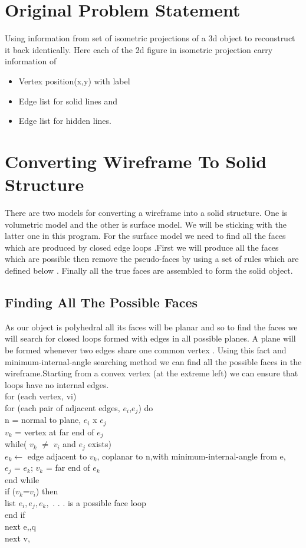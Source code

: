 \documentclass{article}
\begin{document}
\section{Original Problem Statement}
Using information from set of isometric projections of a 3d object to reconstruct it back identically. Here each of the 2d figure in isometric projection carry information of 
\begin{itemize}
\item Vertex position(x,y) with label
\item Edge list for solid lines and 
\item Edge list for hidden lines. 
\end{itemize}
\section{Converting Wireframe To Solid Structure}
There are two models for converting a wireframe into a solid structure. One is volumetric model and the other is surface model. We will be sticking with the latter one in this program. For the surface model we need to find all the faces which are produced by closed edge loops .First we will produce all the faces which are possible then remove the pseudo-faces by using a set of rules which are defined below . Finally all the true faces are assembled to form the solid object. 
\subsection{Finding All The Possible Faces}
As our object is polyhedral all its faces will be planar and so to find the faces we will search for closed loops formed with edges in all possible planes. A plane will be formed whenever two edges share one common vertex . Using this fact and minimum-internal-angle searching method we can find all the possible faces in the wireframe.Starting from a convex vertex (at the extreme left) we can ensure that loops have no internal edges.
\\for (each vertex, vi)
\\for (each pair of adjacent edges, $e_i$,$e_j$) do
\\n = normal to plane, $e_i$ x $e_j$
\\$v_k$ = vertex at far end of $e_j$
\\ while( $v_k$ $\neq$  $v_i$ and $e_j$ exists)
\\$e_k \longleftarrow$ edge adjacent to $v_k$, coplanar to n,with minimum-internal-angle from e,
\\$e_j$ = $e_k$; $v_k$ = far end of $e_k$
\\end while
\\if ($v_k$=$v_i$) then
\\list $ e_i,e_j,e_k,$ . . . is a possible face loop
\\end if
\\next e,,q
\\next v, 
\end{document}
